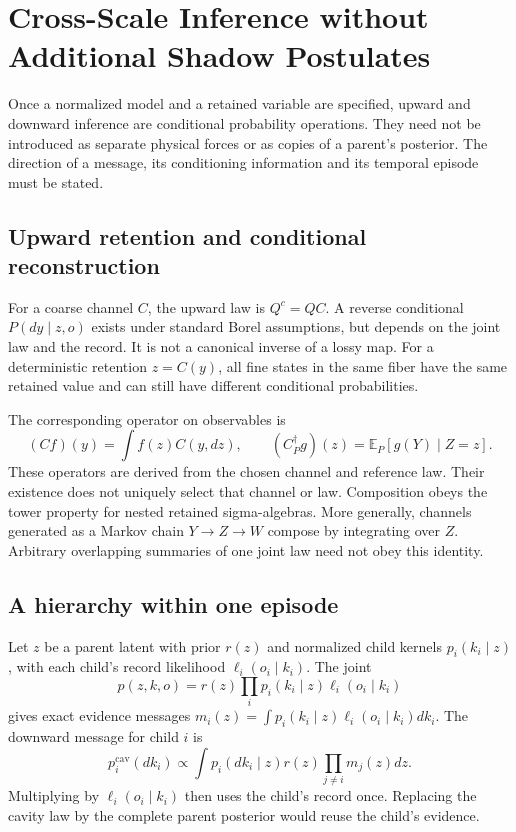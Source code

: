 \section{Cross-Scale Inference without Additional Shadow Postulates}\label{sec:cross_scale_shadows}

Once a normalized model and a retained variable are specified, upward and downward inference are conditional probability operations. They need not be introduced as separate physical forces or as copies of a parent's posterior. The direction of a message, its conditioning information and its temporal episode must be stated.

\subsection{Upward retention and conditional reconstruction}
For a coarse channel $C$, the upward law is $Q^c=QC$. A reverse conditional $P(dy\mid z,o)$ exists under standard Borel assumptions, but depends on the joint law and the record. It is not a canonical inverse of a lossy map. For a deterministic retention $z=C(y)$, all fine states in the same fiber have the same retained value and can still have different conditional probabilities.

The corresponding operator on observables is
\begin{equation}
(Cf)(y)=\int f(z)C(y,dz),
\qquad
(C^\dagger_Pg)(z)=\mathbb E_P[g(Y)\mid Z=z].
\label{eq:cross_scale_operators}
\end{equation}
These operators are derived from the chosen channel and reference law. Their existence does not uniquely select that channel or law. Composition obeys the tower property for nested retained sigma-algebras. More generally, channels generated as a Markov chain $Y\to Z\to W$ compose by integrating over $Z$. Arbitrary overlapping summaries of one joint law need not obey this identity.

\subsection{A hierarchy within one episode}
Let $z$ be a parent latent with prior $r(z)$ and normalized child kernels $p_i(k_i\mid z)$, with each child's record likelihood $\ell_i(o_i\mid k_i)$. The joint
\begin{equation}
p(z,k,o)=r(z)\prod_i p_i(k_i\mid z)\ell_i(o_i\mid k_i)
\label{eq:hierarchical_normalized_joint}
\end{equation}
gives exact evidence messages
$m_i(z)=\int p_i(k_i\mid z)\ell_i(o_i\mid k_i)dk_i$.
The downward message for child $i$ is
\begin{equation}
p_i^{\mathrm{cav}}(dk_i)\propto
\int p_i(dk_i\mid z)r(z)\prod_{j\ne i}m_j(z)dz.
\label{eq:cavity_predictive_prior}
\end{equation}
Multiplying by $\ell_i(o_i\mid k_i)$ then uses the child's record once. Replacing the cavity law by the complete parent posterior would reuse the child's evidence.

